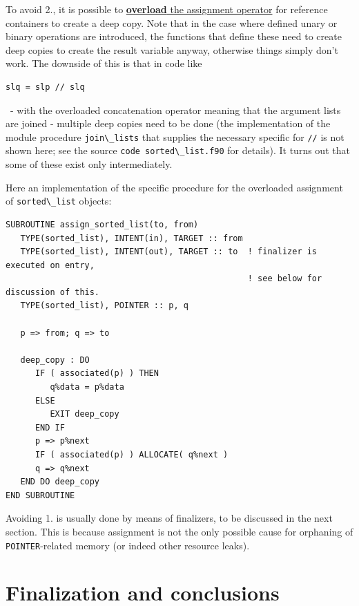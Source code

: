 \documentclass[
  paper=a4,
  ,captions=tableheading
]{scrartcl}
\newcommand{\passthrough}[1]{#1}
\begin{document}
To avoid 2., it is possible to
\href{https://en.wikipedia.org/wiki/Fortran_95_language_features\#Derived-data_types}{\textbf{overload}
the assignment operator} for reference containers to create a deep copy.
Note that in the case where defined unary or binary operations are
introduced, the functions that define these need to create deep copies
to create the result variable anyway, otherwise things simply don't
work. The downside of this is that in code like

\begin{lstlisting}
slq = slp // slq
\end{lstlisting}

~- with the overloaded concatenation operator meaning that the argument
lists are joined - multiple deep copies need to be done (the
implementation of the module procedure
\passthrough{\lstinline!join\_lists!} that supplies the necessary
specific for \passthrough{\lstinline!//!} is not shown here; see the
source \passthrough{\lstinline!code sorted\_list.f90!} for details). It
turns out that some of these exist only intermediately.

Here an implementation of the specific procedure for the overloaded
assignment of \passthrough{\lstinline!sorted\_list!} objects:

\begin{lstlisting}
SUBROUTINE assign_sorted_list(to, from)
   TYPE(sorted_list), INTENT(in), TARGET :: from
   TYPE(sorted_list), INTENT(out), TARGET :: to  ! finalizer is executed on entry,
                                                 ! see below for discussion of this.
   TYPE(sorted_list), POINTER :: p, q

   p => from; q => to

   deep_copy : DO
      IF ( associated(p) ) THEN
         q%data = p%data
      ELSE
         EXIT deep_copy
      END IF
      p => p%next
      IF ( associated(p) ) ALLOCATE( q%next )
      q => q%next
   END DO deep_copy
END SUBROUTINE
\end{lstlisting}

Avoiding 1. is usually done by means of finalizers, to be discussed in
the next section. This is because assignment is not the only possible
cause for orphaning of \passthrough{\lstinline!POINTER!}-related memory
(or indeed other resource leaks).

\section{Finalization and
conclusions}\label{finalization-and-conclusions}
\end{document}
